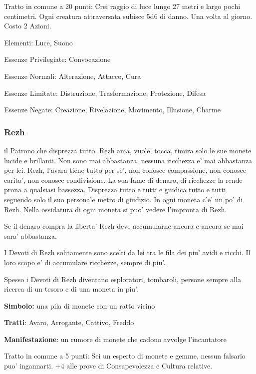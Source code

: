 \documentclass[a4paper,11pt,twoside,openany]{book}
\begin{document}
{Tratto in comune a 20 punti: Crei raggio di luce lungo 27 metri e largo pochi centimetri. Ogni creatura attraversata subisce 5d6 di danno. Una volta al giorno. Costo 2 Azioni.

\bigskip

Elementi: Luce, Suono

\bigskip

Essenze Privilegiate: Convocazione

Essenze Normali: Alterazione, Attacco, Cura

Essenze Limitate: Distruzione, Trasformazione, Protezione, Difesa

Essenze Negate: Creazione, Rivelazione, Movimento, Illusione, Charme

\subsubsection{Rezh}

\label{rezh}

il Patrono che disprezza tutto. Rezh ama, vuole, tocca, rimira solo le sue monete lucide e brillanti. Non sono mai abbastanza, nessuna ricchezza e' mai abbastanza per lei. Rezh, l'avara tiene tutto per se', non conosce compassione, non conosce carita', non conosce condivisione. La sua fame di denaro, di ricchezze la rende prona a qualsiasi bassezza. Disprezza tutto e tutti e giudica tutto e tutti seguendo solo il suo personale metro di giudizio. In ogni moneta c'e' un po' di Rezh. Nella ossidatura di ogni moneta si puo' vedere l'impronta di Rezh.

Se il denaro compra la liberta' Rezh deve accumularne ancora e ancora se mai sara' abbastanza.

I Devoti di Rezh solitamente sono scelti da lei tra le fila dei piu' avidi e ricchi. Il loro scopo e' di accumulare ricchezze, sempre di piu'.

Spesso i Devoti di Rezh diventano esploratori, tombaroli, persone sempre alla ricerca di un tesoro e di una moneta in piu'.

\textbf{Simbolo:} una pila di monete con un ratto vicino

\textbf{Tratti}: Avaro, Arrogante, Cattivo, Freddo

\textbf{Manifestazione}: un rumore di monete che cadono avvolge l'incantatore

\bigskip

Tratto in comune a 5 punti: Sei un esperto di monete e gemme, nessun falsario puo' ingannarti. +4 alle prove di Consapevolezza e Cultura relative.

}
\end{document}
